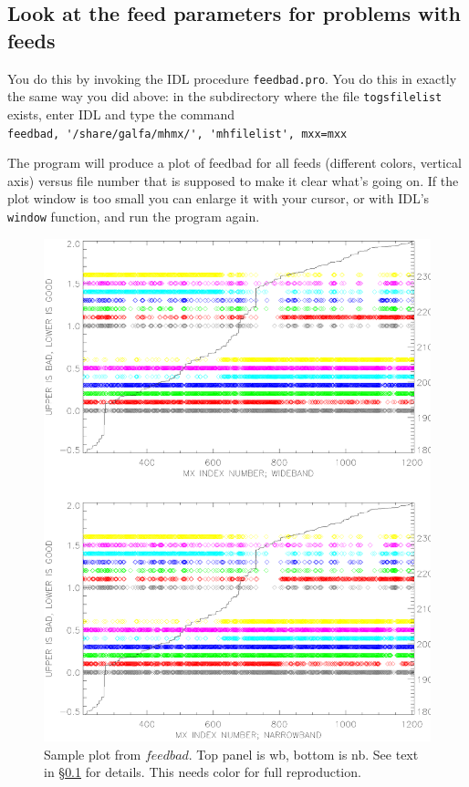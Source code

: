 \documentclass[psfig,preprint]{aastex}
\begin{document}
\subsection{Look at the feed parameters for problems with feeds}
\label{feedbad}

	You do this by invoking the IDL procedure \verb$feedbad.pro$.
You do this in exactly the same way you did above: in the subdirectory 
where the file \verb$togsfilelist$ exists, enter IDL and type the command \\
\verb$feedbad, '/share/galfa/mhmx/', 'mhfilelist', mxx=mxx$ 

	The program will produce a plot of feedbad for all feeds
(different colors, vertical axis) versus file number that is supposed to
make it clear what's going on.  If the plot window is too small you can
enlarge it with your cursor, or with IDL's \verb$window$ function, and
run the program again. 

\begin{figure}[!p]
\begin{center}
\includegraphics[width=7in]{feedbad.ps}
\end{center}
\caption{Sample plot from $feedbad$. Top panel is wb, bottom is nb. 
See text in \S \ref{feedbad}
for details. This needs color for full reproduction. \label{feedbadps}}
\end{figure}
\end{document}
